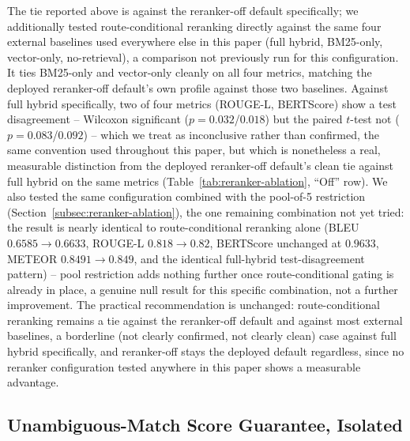 \documentclass[a4paper,twoside]{article}
\begin{document}
The tie reported above is against the reranker-off default specifically; we additionally tested route-conditional reranking directly against the same four external baselines used everywhere else in this paper (full hybrid, BM25-only, vector-only, no-retrieval), a comparison not previously run for this configuration. It ties BM25-only and vector-only cleanly on all four metrics, matching the deployed reranker-off default's own profile against those two baselines. Against full hybrid specifically, two of four metrics (ROUGE-L, BERTScore) show a test disagreement -- Wilcoxon significant ($p=0.032$/$0.018$) but the paired $t$-test not ($p=0.083$/$0.092$) -- which we treat as inconclusive rather than confirmed, the same convention used throughout this paper, but which is nonetheless a real, measurable distinction from the deployed reranker-off default's clean tie against full hybrid on the same metrics (Table~\ref{tab:reranker-ablation}, ``Off'' row). We also tested the same configuration combined with the pool-of-5 restriction (Section~\ref{subsec:reranker-ablation}), the one remaining combination not yet tried: the result is nearly identical to route-conditional reranking alone (BLEU $0.6585\to0.6633$, ROUGE-L $0.818\to0.82$, BERTScore unchanged at $0.9633$, METEOR $0.8491\to0.849$, and the identical full-hybrid test-disagreement pattern) -- pool restriction adds nothing further once route-conditional gating is already in place, a genuine null result for this specific combination, not a further improvement. The practical recommendation is unchanged: route-conditional reranking remains a tie against the reranker-off default and against most external baselines, a borderline (not clearly confirmed, not clearly clean) case against full hybrid specifically, and reranker-off stays the deployed default regardless, since no reranker configuration tested anywhere in this paper shows a measurable advantage.

\subsection{Unambiguous-Match Score Guarantee, Isolated}
\label{subsec:unambiguous}
\end{document}
